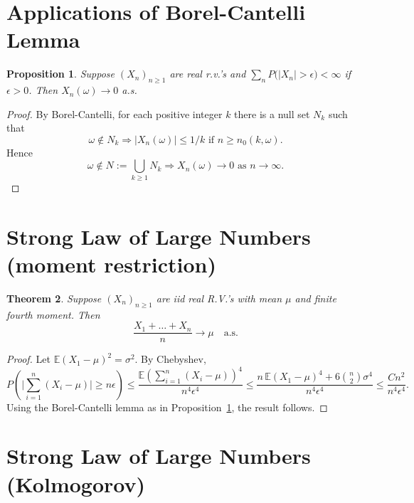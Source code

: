 \documentclass[a4paper]{amsart}
\theoremstyle{plain}
\newtheorem{theorem}{Theorem}[section]
\newtheorem{proposition}[theorem]{Proposition}
\theoremstyle{definition}
\theoremstyle{remark}
\begin{document}
\section{Applications of Borel-Cantelli Lemma}

\begin{proposition} \label{appbc} Suppose $ (X_n)_{n\geq 1} $ are real r.v.'s and $ \sum_nP\big(|X_n|> \epsilon \big) < \infty $ if $ \epsilon > 0 $.  Then $ X_n( \omega ) \to 0 $ a.s.
\end{proposition}

\begin{proof} By Borel-Cantelli, for each positive integer $ k $  there is a null set $ N_k $ such that
\[
\omega \notin N_k \Longrightarrow |X_n( \omega ) | \leq 1/k \text{ if } n \geq n_0(k, \omega ).
\]
Hence 
\[
 \omega \notin N:= \bigcup_{k \geq 1} N_k  \Longrightarrow X_n( \omega ) \to 0 \text{ as } n \to \infty .
 \]
\end{proof} 


\section{Strong Law of Large Numbers (moment restriction)} 

\begin{theorem}   Suppose $ (X_n)_{n\geq 1} $ are iid real R.V.'s with mean $ \mu $ and finite fourth moment.  Then
\[
\frac{X_1 + \dots + X_n}{n} \to  \mu  \quad \text{a.s.}
 \]
\end{theorem} 

\begin{proof} Let $ \mathbb{E} (X_1-\mu)^2 = \sigma ^ 2 $.
By Chebyshev,
\[
P\left( \bigg| \sum_{i=1}^n (X_i - \mu) \bigg| \geq n \epsilon \right) 
\leq \frac{ \mathbb{E} \left( \sum_{i=1}^n (X_i - \mu )\right)^4} { n^4 \epsilon ^4 } 
   \leq \frac{ n\,  \mathbb{E} (X_1-\mu)^4  + 6 \binom{n}{2} \sigma ^4 } { n^4 \epsilon ^4 } \leq \frac{Cn^2}{n^4 \epsilon ^4}  .
   \]
Using the Borel-Cantelli lemma as in Proposition~\ref{appbc}, the result follows.
\end{proof} 

 


\section{Strong Law of Large Numbers (Kolmogorov)} 
\end{document}
